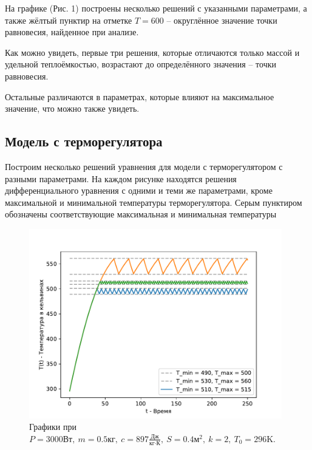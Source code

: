         На графике (Рис. 1) построены несколько решений с указанными параметрами, а также жёлтый пунктир на отметке $T = 600$ -- округлённое значение точки равновесия, найденное при анализе.
        
        Как можно увидеть, первые три решения, которые отличаются только массой и удельной теплоёмкостью, возрастают до определённого значения -- точки равновесия. 
        
        Остальные различаются в параметрах, которые влияют на максимальное значение, что можно также увидеть.
    
    \subsection{Модель с терморегулятора}
        Построим несколько решений уравнения для модели с терморегулятором с разными параметрами. На каждом рисунке находятся решения дифференциального уравнения с одними и теми же параметрами, кроме максимальной и минимальной температуры терморегулятора. Серым пунктиром обозначены соответствующие максимальная и минимальная температуры


        \begin{figure}[H]
            \centering
            \includegraphics[width=11cm]{pictures/utug2.pdf}
            \caption{Графики при $P = 3000 \text{Вт}, ~ m = 0.5 \text{кг}, ~ c = 897 \frac{\text{Дж}}{\text{кг} \cdot \text{К}}, ~ S = 0.4 \text{м}^2, ~ k = 2, ~ T_0 = 296 \text{K}$.}
        \end{figure}



